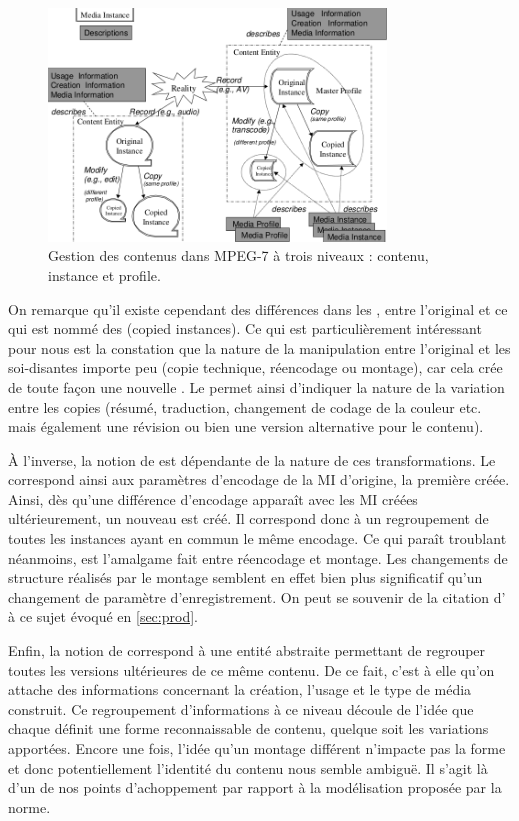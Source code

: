 \begin{figure}[ht!]
\centering
\includegraphics[width=0.8\textwidth]{images/MPEG-7-MediaManagement.png}
\caption{Gestion des contenus dans MPEG-7 à trois niveaux : contenu, instance et profile.}
\label{img:soa:media}
\end{figure}


On remarque qu'il existe cependant des différences dans les , entre l'original et ce qui est nommé des  (copied instances). 
Ce qui est particulièrement intéressant pour nous est la constation que la nature de la manipulation entre l'original et les soi-disantes  importe peu (copie technique, réencodage ou montage), car cela crée de toute façon une nouvelle . 
Le  permet ainsi d'indiquer la nature de la variation entre les copies (résumé, traduction, changement de codage de la couleur etc. mais également une révision ou bien une version alternative pour le contenu).

À l'inverse, la notion de  est dépendante de la nature de ces transformations. 
Le  correspond ainsi aux paramètres d'encodage de la MI d'origine, la première créée. 
Ainsi, dès qu'une différence d'encodage apparaît avec les MI créées ultérieurement, un nouveau  est créé. 
Il correspond donc à un regroupement de toutes les instances ayant en commun le même encodage. 
Ce qui paraît troublant néanmoins, est l'amalgame fait entre réencodage et montage. 
Les changements de structure réalisés par le montage semblent en effet bien plus significatif qu'un changement de paramètre d'enregistrement. 
On peut se souvenir de la citation d' à ce sujet évoqué en \ref{sec:prod}.

Enfin, la notion de  correspond à une entité abstraite permettant de regrouper toutes les versions ultérieures de ce même contenu.
De ce fait, c'est à elle qu'on attache des informations concernant la création, l'usage et le type de média construit. %
Ce regroupement d'informations à ce niveau découle de l'idée que chaque  définit une forme reconnaissable de contenu, quelque soit les variations apportées.
Encore une fois, l'idée qu'un montage différent n'impacte pas la forme et donc potentiellement l'identité du contenu nous semble ambiguë. 
Il s'agit là d'un de nos points d'achoppement par rapport à la modélisation proposée par la norme. 




